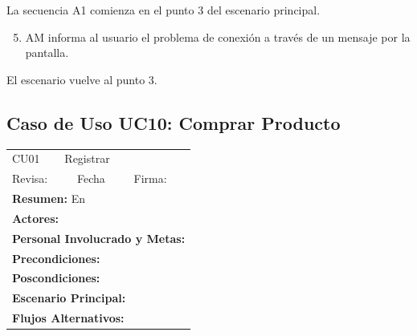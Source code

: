 \begin{framed}
La secuencia A1 comienza en el punto 3 del escenario principal.
\begin{enumerate}
    \setcounter{enumi}{4}
    \item AM informa al usuario el problema de conexión a través de un mensaje por la pantalla.
\end{enumerate}
El escenario vuelve al punto 3.

\end{framed}


\subsection{Caso de Uso UC10: Comprar Producto}

\begin{longtable}{|l|p{5.5cm}|l|p{2cm}|l|p{1.9cm}|} \hline
    \cellcolor{grisOscuro} CU01 & \multicolumn{4}{|l|}{  \cellcolor{grisOscuro} Registrar} &  \cellcolor{grisClaro}\multirow{2}{1cm}{} \\ \cline{1-5}
    \cellcolor{grisOscuro} Revisa: &  \cellcolor{grisClaro} &  \cellcolor{grisOscuro} Fecha &  \cellcolor{grisClaro} &  \cellcolor{grisOscuro} Firma: & \cellcolor{grisClaro} \\ \hline
    \multicolumn{6}{|p{15cm}|}{ \textbf{Resumen: } En

    } \\ \hline

    \multicolumn{6}{|p{15cm}|}{ \textbf{Actores: }

    } \\ \hline

    \multicolumn{6}{|p{15cm}|}{ \textbf{Personal Involucrado y Metas: }

    } \\ \hline

    \multicolumn{6}{|p{15cm}|}{ \textbf{Precondiciones: }

    } \\ \hline

    \multicolumn{6}{|p{15cm}|}{ \textbf{Poscondiciones: }

    } \\ \hline

    \multicolumn{6}{|p{15cm}|}{ \textbf{Escenario Principal: }

    } \\ \hline

    \multicolumn{6}{|p{15cm}|}{ \textbf{Flujos Alternativos: }

    } \\ \hline

\end{longtable}

